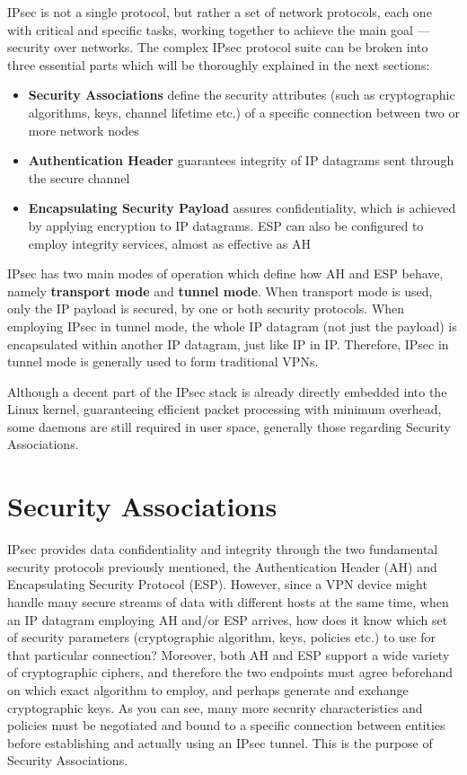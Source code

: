 \documentclass[a4paper,12pt]{report}
\begin{document}
		IPsec is not a single protocol, but rather a set of network protocols, each one with critical and specific tasks, working together to achieve the main goal --- security over networks. The complex IPsec protocol suite can be broken into three essential parts which will be thoroughly explained in the next sections:
		\begin{itemize}
			\item \textbf{Security Associations} define the security attributes (such as cryptographic algorithms, keys, channel lifetime etc.) of a specific connection between two or more network nodes
			\item \textbf{Authentication Header} guarantees integrity of IP datagrams sent through the secure channel \cite{rfc4302}
			\item \textbf{Encapsulating Security Payload} assures confidentiality, which is achieved by applying encryption to IP datagrams. ESP can also be configured to employ integrity services, almost as effective as AH \cite{rfc2406}
		\end{itemize}
		
		IPsec has two main modes of operation which define how AH and ESP behave, namely \textbf{transport mode} and \textbf{tunnel mode}. When transport mode is used, only the IP payload is secured, by one or both security protocols. When employing IPsec in tunnel mode, the whole IP datagram (not just the payload) is encapsulated within another IP datagram, just like IP in IP. Therefore, IPsec in tunnel mode is generally used to form traditional VPNs.
		
		Although a decent part of the IPsec stack is already directly embedded into the Linux kernel, guaranteeing efficient packet processing with minimum overhead, some daemons are still required in user space, generally those regarding Security Associations.
		
	\section{Security Associations}
	IPsec provides data confidentiality and integrity through the two fundamental security protocols previously mentioned, the Authentication Header (AH) and Encapsulating Security Protocol (ESP). However, since a VPN device might handle many secure streams of data with different hosts at the same time, when an IP datagram employing AH and/or ESP arrives, how does it know which set of security parameters (cryptographic algorithm, keys, policies etc.) to use for that particular connection? Moreover, both AH and ESP support a wide variety of cryptographic ciphers, and therefore the two endpoints must agree beforehand on which exact algorithm to employ, and perhaps generate and exchange cryptographic keys. As you can see, many more security characteristics and policies must be negotiated and bound to a specific connection between entities before establishing and actually using an IPsec tunnel. This is the purpose of Security Associations. 
	
\end{document}
